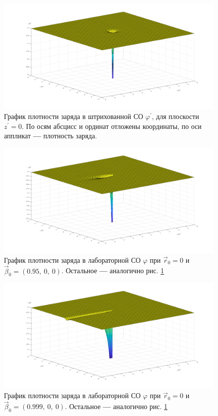\documentclass[oneside,final,14pt]{extarticle}
\begin{document}
\begin{figure}
\centering
\includegraphics[scale=0.36]{spd0orig.png}
\caption{График плотности заряда в штрихованной СО $\varphi^{\prime}$, для плоскости $z^{\prime}=0$. По осям абсцисс и ординат отложены координаты, по оси аппликат \textbf{---} плотность заряда.}
\label{ris:rho0}
\end{figure}

\begin{figure}
\centering
\includegraphics[scale=0.36]{spd095orig.png}
\caption{График плотности заряда в лабораторной СО $\varphi$ при $\vec r_{0}=0$ и $\vec \beta_0 = (0.95, \ 0, \ 0)$. Остальное \textbf{---} аналогично рис. \ref{ris:rho0}}
\label{ris:rho095}
\end{figure}

\begin{figure}
\centering
\includegraphics[scale=0.36]{spd0999orig.png}
\caption{График плотности заряда в лабораторной СО $\varphi$ при $\vec r_{0}=0$ и $\vec \beta_0 = (0.999, \ 0, \ 0)$. Остальное \textbf{---} аналогично рис. \ref{ris:rho0}}
\label{ris:rho0999}
\end{figure}
\end{document}
